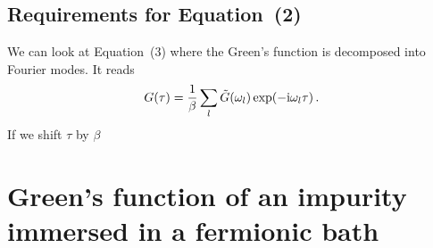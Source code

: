 \documentclass[11pt, english, fleqn, DIV=15, headinclude, BCOR=1cm]{scrartcl}
\begin{document}
\subsection{Requirements for Equation~(2)}

We can look at Equation~(3) where the Green's function is decomposed into
Fourier modes. It reads
\[
    G(\tau) = \frac 1 \beta \sum_l \tilde G(\omega_l) \exp(- \mathrm i \omega_l
    \tau) \,.
\]
If we shift $\tau$ by $\beta$

\section{Green's function of an impurity immersed in a fermionic bath}
\label{homework:2}
\end{document}
